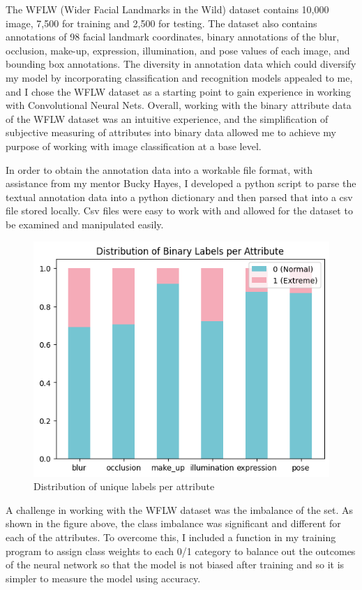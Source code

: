 \documentclass{article}
\begin{document}
The WFLW (Wider Facial Landmarks in the Wild) dataset contains 10,000 image, 7,500 for training and 2,500 for testing. The dataset also contains annotations of 98 facial landmark coordinates, binary annotations of the blur, occlusion, make-up, expression, illumination, and pose values of each image, and bounding box annotations. The diversity in annotation data which could diversify my model by incorporating classification and recognition models appealed to me, and I chose the WFLW dataset as a starting point to gain experience in working with Convolutional Neural Nets. Overall, working with the binary attribute data of the WFLW dataset was an intuitive experience, and the simplification of subjective measuring of attributes into binary data allowed me to achieve my purpose of working with image classification at a base level. 

In order to obtain the annotation data into a workable file format, with assistance from my mentor Bucky Hayes, I developed a python script to parse the textual annotation data into a python dictionary and then parsed that into a csv file stored locally. Csv files were easy to work with and allowed for the dataset to be examined and manipulated easily.

\begin{figure}[h]
    \centering
    \includegraphics[width=0.8\linewidth]{Distro-of-binary-annotation-labels.png}
    \caption{Distribution of unique labels per attribute}
    \label{fig:enter-label}
\end{figure}
A challenge in working with the WFLW dataset was the imbalance of the set. As shown in the figure above, the class imbalance was significant and different for each of the attributes. To overcome this, I included a function in my training program to assign class weights to each 0/1 category to balance out the outcomes of the neural network so that the model is not biased after training and so it is simpler to measure the model using accuracy. 
\\
\end{document}
